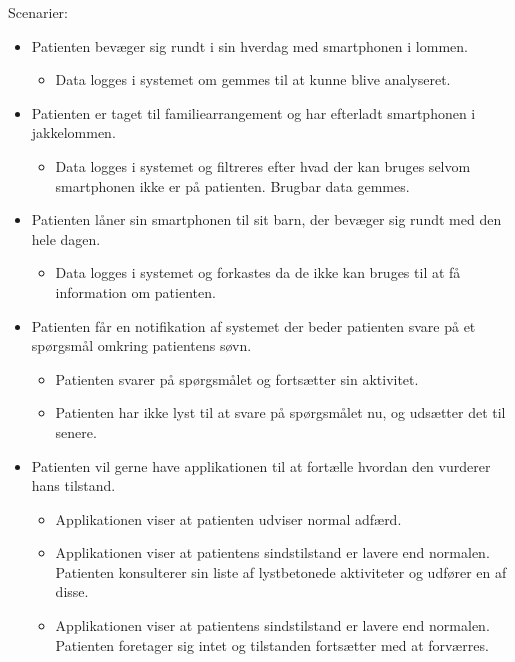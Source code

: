 Scenarier:
\begin{itemize}
	\item Patienten bevæger sig rundt i sin hverdag med smartphonen i lommen. 
	\begin{itemize}
		\item Data logges i systemet om gemmes til at kunne blive analyseret.
	\end{itemize}
	
	\item Patienten er taget til familiearrangement og har efterladt smartphonen i jakkelommen.
	\begin{itemize}
		\item Data logges i systemet og filtreres efter hvad der kan bruges selvom smartphonen ikke er på patienten.
		Brugbar data gemmes.
	\end{itemize}
	
	\item Patienten låner sin smartphonen til sit barn, der bevæger sig rundt med den hele dagen.
	\begin{itemize}
		\item Data logges i systemet og forkastes da de ikke kan bruges til at få information om patienten.
	\end{itemize}
	
	\item Patienten får en notifikation af systemet der beder patienten svare på et spørgsmål omkring patientens søvn.
	\begin{itemize}
		\item Patienten svarer på spørgsmålet og fortsætter sin aktivitet.
		\item Patienten har ikke lyst til at svare på spørgsmålet nu, og udsætter det til senere.
	\end{itemize}
	
	\item Patienten vil gerne have applikationen til at fortælle hvordan den vurderer hans tilstand.
	\begin{itemize}
		\item Applikationen viser at patienten udviser normal adfærd.
		\item Applikationen viser at patientens sindstilstand er lavere end normalen. Patienten konsulterer sin liste af lystbetonede aktiviteter og udfører en af disse.
		\item Applikationen viser at patientens sindstilstand er lavere end normalen. Patienten foretager sig intet og tilstanden fortsætter med at forværres.
	\end{itemize}

\end{itemize}

